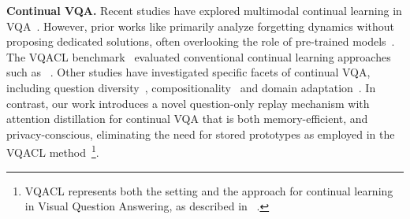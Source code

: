 \noindent \textbf{Continual VQA. }Recent studies have explored multimodal continual learning in VQA~\citep{del2020ratt, greco2019psycholinguistics, nikandrou2022task, srinivasan2022climb}. However, prior works like \citet{greco2019psycholinguistics} primarily analyze forgetting dynamics without proposing dedicated solutions, often overlooking the role of pre-trained models~\citep{mehta2021empirical}. The VQACL benchmark~\citep{zhang2023vqacl} evaluated conventional continual learning approaches such as ~\citep{chaudhry2019tinyepisodicmemoriescontinual, Chaudhry2019er, Wan_2022_CVPR, zhang2023vqacl}. Other studies have investigated specific facets of continual VQA, including question diversity~\citep{greco2019psycholinguistics}, compositionality~\citep{zhang2023vqacl} and domain adaptation~\citep{zhang-etal-2022-continual}. In contrast, our work introduces a novel question-only replay mechanism with attention distillation for continual VQA that is both memory-efficient, and privacy-conscious, eliminating the need for stored prototypes as employed in the VQACL method~\citep{zhang2023vqacl}\footnote{VQACL represents both the setting and the approach for continual learning in Visual Question Answering, as described in ~\citep{zhang2023vqacl}.}. 